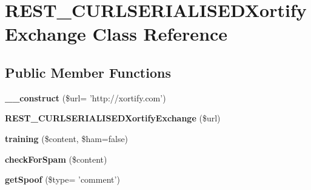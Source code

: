 \hypertarget{class_r_e_s_t___c_u_r_l_s_e_r_i_a_l_i_s_e_d_xortify_exchange}{\section{R\-E\-S\-T\-\_\-\-C\-U\-R\-L\-S\-E\-R\-I\-A\-L\-I\-S\-E\-D\-Xortify\-Exchange Class Reference}
\label{class_r_e_s_t___c_u_r_l_s_e_r_i_a_l_i_s_e_d_xortify_exchange}
}
\subsection*{Public Member Functions}
\begin{DoxyCompactItemize}
\item 
\hypertarget{class_r_e_s_t___c_u_r_l_s_e_r_i_a_l_i_s_e_d_xortify_exchange_aa6e746b8c0b153a336162582d3c86e95}{{\bfseries \-\_\-\-\_\-construct} (\$url= 'http\-://xortify.\-com')}\label{class_r_e_s_t___c_u_r_l_s_e_r_i_a_l_i_s_e_d_xortify_exchange_aa6e746b8c0b153a336162582d3c86e95}

\item 
\hypertarget{class_r_e_s_t___c_u_r_l_s_e_r_i_a_l_i_s_e_d_xortify_exchange_af60ebb943147616a6c7b61577f5724ee}{{\bfseries R\-E\-S\-T\-\_\-\-C\-U\-R\-L\-S\-E\-R\-I\-A\-L\-I\-S\-E\-D\-Xortify\-Exchange} (\$url)}\label{class_r_e_s_t___c_u_r_l_s_e_r_i_a_l_i_s_e_d_xortify_exchange_af60ebb943147616a6c7b61577f5724ee}

\item 
\hypertarget{class_r_e_s_t___c_u_r_l_s_e_r_i_a_l_i_s_e_d_xortify_exchange_a537004f9066ce94b2d5288e986919002}{{\bfseries training} (\$content, \$ham=false)}\label{class_r_e_s_t___c_u_r_l_s_e_r_i_a_l_i_s_e_d_xortify_exchange_a537004f9066ce94b2d5288e986919002}

\item 
\hypertarget{class_r_e_s_t___c_u_r_l_s_e_r_i_a_l_i_s_e_d_xortify_exchange_a329cf1d7611da6d73b6a7c1f269880eb}{{\bfseries check\-For\-Spam} (\$content)}\label{class_r_e_s_t___c_u_r_l_s_e_r_i_a_l_i_s_e_d_xortify_exchange_a329cf1d7611da6d73b6a7c1f269880eb}

\item 
\hypertarget{class_r_e_s_t___c_u_r_l_s_e_r_i_a_l_i_s_e_d_xortify_exchange_ab5700ea53eb2491f0ddd002191e3c02d}{{\bfseries get\-Spoof} (\$type= 'comment')}\label{class_r_e_s_t___c_u_r_l_s_e_r_i_a_l_i_s_e_d_xortify_exchange_ab5700ea53eb2491f0ddd002191e3c02d}


\end{DoxyCompactItemize}
